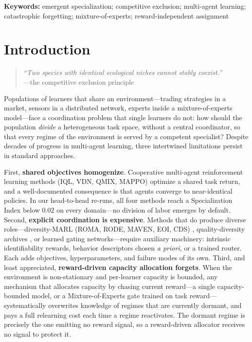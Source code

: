 \documentclass[11pt]{article}
\begin{document}
\vspace{0.3cm}
\noindent\textbf{Keywords:} emergent specialization; competitive exclusion;
multi-agent learning; catastrophic forgetting; mixture-of-experts;
reward-independent assignment

\newpage
\tableofcontents
\newpage

\section{Introduction}

\begin{quote}
\emph{``Two species with identical ecological niches cannot stably coexist.''}\\
---the competitive exclusion principle \cite{gause1934struggle,hardin1960competitive}
\end{quote}

Populations of learners that share an environment---trading strategies in a
market, sensors in a distributed network, experts inside a mixture-of-experts
model---face a coordination problem that single learners do not: how should the
population \emph{divide} a heterogeneous task space, without a central
coordinator, so that every regime of the environment is served by a competent
specialist? Despite decades of progress in multi-agent learning, three
intertwined limitations persist in standard approaches.

First, \textbf{shared objectives homogenize}. Cooperative multi-agent
reinforcement learning methods (IQL, VDN, QMIX, MAPPO)
\cite{tan1993multi,rashid2018qmix,yu2022surprising} optimize a shared task
return, and a well-documented consequence is that agents converge to
near-identical policies. In our head-to-head re-runs, all four methods reach a
Specialization Index below $0.02$ on every domain---no division of labor emerges
by default. Second, \textbf{explicit coordination is expensive}. Methods that do
produce diverse roles---diversity-MARL (ROMA, RODE, MAVEN, EOI, CDS)
\cite{wang2020roma,wang2021rode,mahajan2019maven,jiang2021eoi,li2021cds},
quality-diversity archives \cite{mouret2015illuminating}, or learned gating
networks---require auxiliary machinery: intrinsic
identifiability rewards, behavior descriptors chosen \emph{a priori}, or a
trained router. Each adds objectives, hyperparameters, and failure modes of its
own. Third, and least appreciated, \textbf{reward-driven capacity allocation
forgets}. When the environment is non-stationary and per-learner capacity is
bounded, any mechanism that allocates capacity by chasing current reward---a
single capacity-bounded model, or a Mixture-of-Experts gate trained on task
reward---systematically overwrites knowledge of regimes that are currently
dormant, and pays a full relearning cost each time a regime reactivates. The
dormant regime is precisely the one emitting no reward signal, so a reward-driven
allocator receives no signal to protect it.
\end{document}
